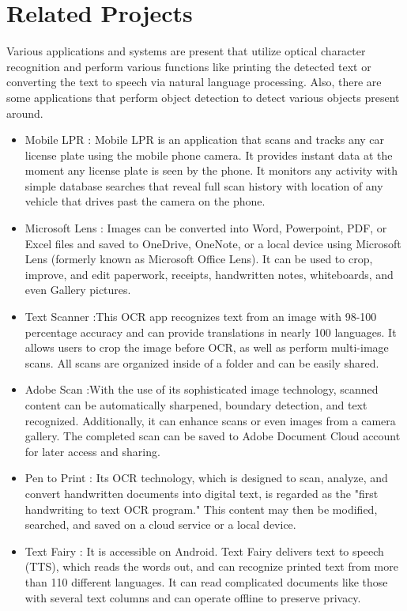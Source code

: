 \section{Related Projects}
Various applications and systems are present that utilize optical character recognition and perform various functions like printing the detected text or converting the text to speech via natural language processing. Also, there are some applications that perform object detection to detect various objects present around.
	\begin{itemize}
		\item Mobile LPR : Mobile \ac{LPR} is an application that scans and tracks any car license plate  using the mobile phone camera. It provides instant data at the moment any license plate is seen by the phone. It monitors any activity with simple database searches that reveal full scan history with location of any vehicle that drives past the camera on the phone.
			\item Microsoft Lens : Images can be converted into Word, Powerpoint, PDF, or Excel files and saved to OneDrive, OneNote, or a local device using Microsoft Lens (formerly known as Microsoft Office Lens). It can be used to crop, improve, and edit paperwork, receipts, handwritten notes, whiteboards, and even Gallery pictures.
			\item Text Scanner :This OCR app recognizes text from an image with 98-100 percentage accuracy and can provide translations in nearly 100 languages. It allows users to crop the image before OCR, as well as perform multi-image scans. All scans are organized inside of a folder and can be easily shared. 
			\item Adobe Scan :With the use of its sophisticated image technology, scanned content can be automatically sharpened, boundary detection, and text recognized. Additionally, it can enhance scans or even images from a camera gallery. The completed scan can be saved to  Adobe Document Cloud account for later access and sharing.
			\item Pen to Print : Its OCR technology, which is designed to scan, analyze, and convert handwritten documents into digital text, is regarded as the "first handwriting to text OCR program." This content may then be modified, searched, and saved on a cloud service or a local device.
			\item Text Fairy : It is accessible on Android. Text Fairy delivers text to speech (\ac{TTS}), which reads the words out, and can recognize printed text from more than 110 different languages. It can read complicated documents like those with several text columns and can operate offline to preserve privacy.
\end{itemize}
